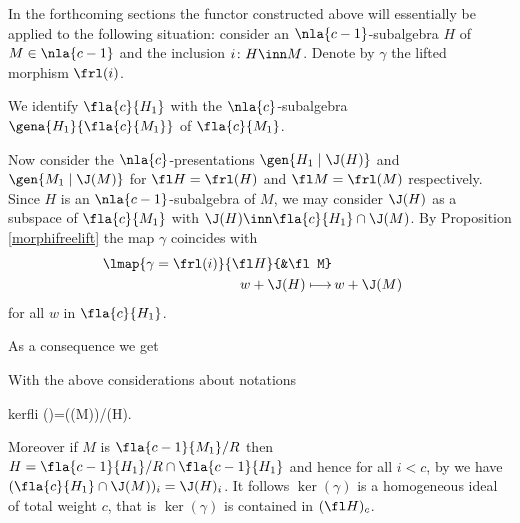 In the forthcoming sections the functor constructed above will essentially be applied to the following situation:
consider an $\nla{c-1}$-subalgebra $H$ of $M\in\nla{c-1}$ and the inclusion $i\colon H\inn M$.
Denote by $\gamma$ the lifted morphism $\frl(i)$.

We identify $\fla{c}{H_{1}}$ with the $\nla{c}$-subalgebra $\gena{H_{1}}{\fla{c}{M_{1}}}$ of $\fla{c}{M_{1}}$.

Now consider the $\nla{c}$-presentations $\gen{H_{1}\mid\J(H)}$ and $\gen{M_{1}\mid\J(M)}$ for $\fl H=\frl(H)$ and $\fl M=\frl(M)$
respectively.
Since $H$ is an $\nla{c-1}$-subalgebra of $M$, we may consider $\J(H)$ as a subspace of $\fla{c}{M_{1}}$ with
$\J(H)\inn\fla{c}{H_{1}}\cap\J(M)$. By Proposition \ref{morphifreelift} the map $\gamma$ coincides with
\begin{align}\label{gam}
\lmap{\gamma%
=\frl(i)}{\fl H}{&\fl M}\\\notag
w+\J(H)\longmapsto & \,w+\J(M)
\end{align}
for all $w$ in $\fla{c}{H_{1}}$.

As a consequence we get
\begin{rem}\label{sangalgano} With the above considerations about notations
\begin{labeq}{kerfli}
\ker(\gamma)=(\cap\J(M))/\J(H).
\end{labeq}

\medskip
Moreover if $M$ is $\fla{c-1}{M_{1}}/R$ then $H=\fla{c-1}{H_{1}}/R\cap\fla{c-1}{H_{1}}$ and hence for all $i<c$, by 
we have $(\fla{c}{H_{1}}\cap\J(M))_{i}=\J(H)_{i}$. It follows
$\ker(\gamma)$ is a homogeneous ideal of total weight $c$, that is $\ker(\gamma)$ is contained in $(\fl H)_{c}$.
\end{rem}

